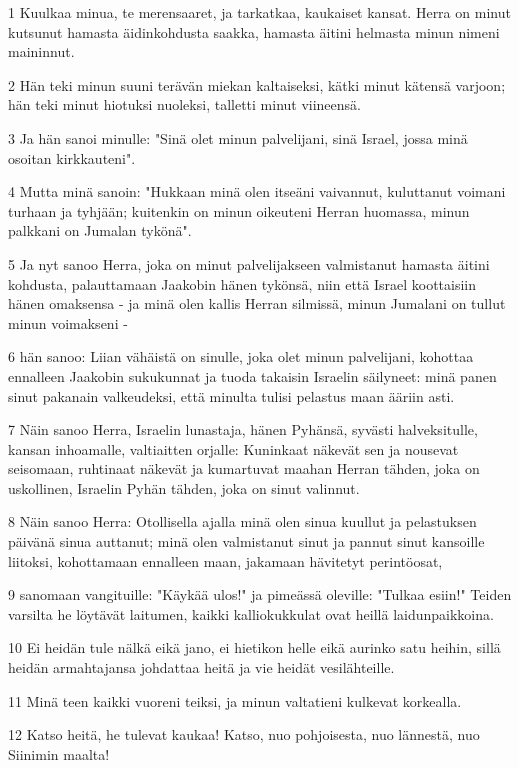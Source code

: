 \par 1 Kuulkaa minua, te merensaaret, ja tarkatkaa, kaukaiset kansat. Herra on minut kutsunut hamasta äidinkohdusta saakka, hamasta äitini helmasta minun nimeni maininnut.
\par 2 Hän teki minun suuni terävän miekan kaltaiseksi, kätki minut kätensä varjoon; hän teki minut hiotuksi nuoleksi, talletti minut viineensä.
\par 3 Ja hän sanoi minulle: "Sinä olet minun palvelijani, sinä Israel, jossa minä osoitan kirkkauteni".
\par 4 Mutta minä sanoin: "Hukkaan minä olen itseäni vaivannut, kuluttanut voimani turhaan ja tyhjään; kuitenkin on minun oikeuteni Herran huomassa, minun palkkani on Jumalan tykönä".
\par 5 Ja nyt sanoo Herra, joka on minut palvelijakseen valmistanut hamasta äitini kohdusta, palauttamaan Jaakobin hänen tykönsä, niin että Israel koottaisiin hänen omaksensa - ja minä olen kallis Herran silmissä, minun Jumalani on tullut minun voimakseni -
\par 6 hän sanoo: Liian vähäistä on sinulle, joka olet minun palvelijani, kohottaa ennalleen Jaakobin sukukunnat ja tuoda takaisin Israelin säilyneet: minä panen sinut pakanain valkeudeksi, että minulta tulisi pelastus maan ääriin asti.
\par 7 Näin sanoo Herra, Israelin lunastaja, hänen Pyhänsä, syvästi halveksitulle, kansan inhoamalle, valtiaitten orjalle: Kuninkaat näkevät sen ja nousevat seisomaan, ruhtinaat näkevät ja kumartuvat maahan Herran tähden, joka on uskollinen, Israelin Pyhän tähden, joka on sinut valinnut.
\par 8 Näin sanoo Herra: Otollisella ajalla minä olen sinua kuullut ja pelastuksen päivänä sinua auttanut; minä olen valmistanut sinut ja pannut sinut kansoille liitoksi, kohottamaan ennalleen maan, jakamaan hävitetyt perintöosat,
\par 9 sanomaan vangituille: "Käykää ulos!" ja pimeässä oleville: "Tulkaa esiin!" Teiden varsilta he löytävät laitumen, kaikki kalliokukkulat ovat heillä laidunpaikkoina.
\par 10 Ei heidän tule nälkä eikä jano, ei hietikon helle eikä aurinko satu heihin, sillä heidän armahtajansa johdattaa heitä ja vie heidät vesilähteille.
\par 11 Minä teen kaikki vuoreni teiksi, ja minun valtatieni kulkevat korkealla.
\par 12 Katso heitä, he tulevat kaukaa! Katso, nuo pohjoisesta, nuo lännestä, nuo Siinimin maalta!
